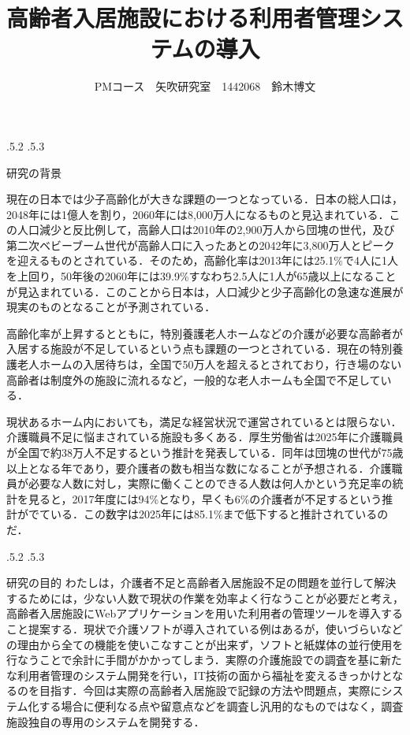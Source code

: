 \documentclass[uplatex]{jsarticle}
\title{\vspace{-14mm}高齢者入居施設における利用者管理システムの導入}
\author{PMコース　矢吹研究室　1442068　鈴木博文}
\date{}%
\makeatletter
\renewcommand{\section}{%
    \if@slide\clearpage\fi
    \@startsection{section}{1}{\z@}%
    {\Cvs \@plus.5\Cdp \@minus.2\Cdp}%
    {.5\Cvs \@plus.3\Cdp}%
    {\normalfont\raggedright}}
\makeatother
\begin{document}
\maketitle

\section{研究の背景}

現在の日本では少子高齢化が大きな課題の一つとなっている．日本の総人口は，2048年には1億人を割り，2060年には8,000万人になるものと見込まれている．この人口減少と反比例して，高齢人口は2010年の2,900万人から団塊の世代，及び第二次ベビーブーム世代が高齢人口に入ったあとの2042年に3,800万人とピークを迎えるものとされている．そのため，高齢化率は2013年には25.1\%で4人に1人を上回り，50年後の2060年には39.9\%すなわち2.5人に1人が65歳以上になることが見込まれている．このことから日本は，人口減少と少子高齢化の急速な進展が現実のものとなることが予測されている\cite{site1}．

高齢化率が上昇するとともに，特別養護老人ホームなどの介護が必要な高齢者が入居する施設が不足しているという点も課題の一つとされている．現在の特別養護老人ホームの入居待ちは，全国で50万人を超えるとされており，行き場のない高齢者は制度外の施設に流れるなど，一般的な老人ホームも全国で不足している\cite{site2}．

現状あるホーム内においても，満足な経営状況で運営されているとは限らない．介護職員不足に悩まされている施設も多くある．厚生労働省は2025年に介護職員が全国で約38万人不足するという推計を発表している．同年は団塊の世代が75歳以上となる年であり，要介護者の数も相当な数になることが予想される．介護職員が必要な人数に対し，実際に働くことのできる人数は何人かという充足率の統計を見ると，2017年度には94\%となり，早くも6\%の介護者が不足するという推計がでている．この数字は2025年には85.1\%まで低下すると推計されているのだ\cite{site3}．

\section{研究の目的}
わたしは，介護者不足と高齢者入居施設不足の問題を並行して解決するためには，少ない人数で現状の作業を効率よく行なうことが必要だと考え，高齢者入居施設にWebアプリケーションを用いた利用者の管理ツールを導入すること提案する．現状で介護ソフトが導入されている例はあるが，使いづらいなどの理由から全ての機能を使いこなすことが出来ず，ソフトと紙媒体の並行使用を行なうことで余計に手間がかかってしまう．実際の介護施設での調査を基に新たな利用者管理のシステム開発を行い，IT技術の面から福祉を変えるきっかけとなるのを目指す．今回は実際の高齢者入居施設で記録の方法や問題点，実際にシステム化する場合に便利なる点や留意点などを調査し汎用的なものではなく，調査施設独自の専用のシステムを開発する．
\end{document}
